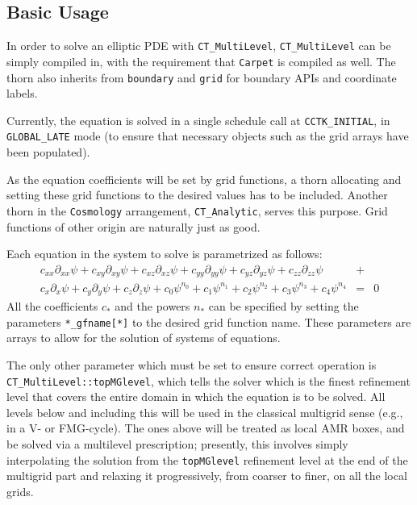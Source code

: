 \subsection{Basic Usage}
In order to solve an elliptic PDE with \texttt{CT\_MultiLevel},
\texttt{CT\_MultiLevel} can be simply compiled in, with the 
requirement that \texttt{Carpet} is compiled as well. The thorn 
also inherits from \texttt{boundary} and \texttt{grid} for boundary 
APIs and coordinate labels.

Currently, the equation is solved in a single schedule call at 
\texttt{CCTK\_INITIAL}, in \texttt{GLOBAL\_LATE} mode (to ensure
that necessary objects such as the grid arrays have been populated).

As the equation coefficients will be set by grid functions, a thorn
allocating and setting these grid functions to the desired values
has to be included. Another thorn in the \texttt{Cosmology} arrangement,
\texttt{CT\_Analytic}, serves this purpose. Grid functions of other
origin are naturally just as good.

Each equation in the system to solve is parametrized as
follows:
\begin{eqnarray}
c_{xx} \partial_{xx} \psi + c_{xy} \partial_{xy} \psi + c_{xz} \partial_{xz} \psi + 
c_{yy} \partial_{yy} \psi + c_{yz} \partial_{yz} \psi + c_{zz} \partial_{zz} \psi &+& \\
c_{x} \partial_{x} \psi + c_{y} \partial_{y} \psi + c_{z} \partial_{z} \psi +
c_{0} \psi^{n_0} + c_{1} \psi^{n_1} + c_{2} \psi^{n_2} + c_{3} \psi^{n_3} + c_4 \psi^{n_4} &=& 0
\end{eqnarray}
All the coefficients $c_*$ and the powers $n_*$ can be specified by
setting the parameters \texttt{*\_gfname[*]} to the desired grid 
function name. These parameters are arrays to allow for the solution 
of systems of equations.

The only other parameter which must be set to ensure correct 
operation is \texttt{CT\_MultiLevel::topMGlevel}, which tells the
solver which is the finest refinement level that covers the entire
domain in which the equation is to be solved. All levels below and
including this will be used in the classical multigrid sense
(e.g., in a V- or FMG-cycle). The ones above will be treated as
local AMR boxes, and be solved via a multilevel prescription; 
presently, this involves simply interpolating the solution from
the \texttt{topMGlevel} refinement level at the end of the 
multigrid part and relaxing it progressively, from coarser to 
finer, on all the local grids. 

